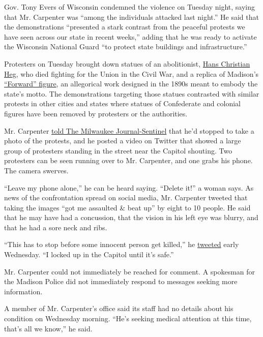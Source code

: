Gov. Tony Evers of Wisconsin condemned the violence on Tuesday night,
saying that Mr. Carpenter was ``among the individuals attacked last
night.'' He said that the demonstrations ``presented a stark contrast
from the peaceful protests we have seen across our state in recent
weeks,'' adding that he was ready to activate the Wisconsin National
Guard ``to protect state buildings and infrastructure.''

Protesters on Tuesday brought down statues of an abolitionist,
\href{https://www.nps.gov/people/hans-heg.htm}{Hans Christian Heg}, who
died fighting for the Union in the Civil War, and a replica of Madison's
\href{https://www.wisconsinhistory.org/Records/Article/CS2752}{``Forward''
figure}, an allegorical work designed in the 1890s meant to embody the
state's motto. The demonstrations targeting those statues contrasted
with similar protests in other cities and states where statues of
Confederate and colonial figures have been removed by protesters or the
authorities.

Mr. Carpenter
\href{https://www.jsonline.com/story/news/2020/06/24/madison-protesters-pull-down-forward-hans-christian-heg-statues-attack-senator-sculptures-in-lake/3247948001/}{told
The Milwaukee Journal-Sentinel} that he'd stopped to take a photo of the
protests, and he posted a video on Twitter that showed a large group of
protesters standing in the street near the Capitol shouting. Two
protesters can be seen running over to Mr. Carpenter, and one grabs his
phone. The camera swerves.

``Leave my phone alone,'' he can be heard saying. ``Delete it!'' a woman
says. As news of the confrontation spread on social media, Mr. Carpenter
tweeted that taking the images ``got me assaulted \& beat up'' by eight
to 10 people. He said that he may have had a concussion, that the vision
in his left eye was blurry, and that he had a sore neck and ribs.

``This has to stop before some innocent person get killed,'' he
\href{https://twitter.com/TimCarpenterMKE/status/1275710960171397121}{tweeted}
early Wednesday. ``I locked up in the Capitol until it's safe.''

Mr. Carpenter could not immediately be reached for comment. A spokesman
for the Madison Police did not immediately respond to messages seeking
more information.

A member of Mr. Carpenter's office said its staff had no details about
his condition on Wednesday morning. ``He's seeking medical attention at
this time, that's all we know,'' he said.

